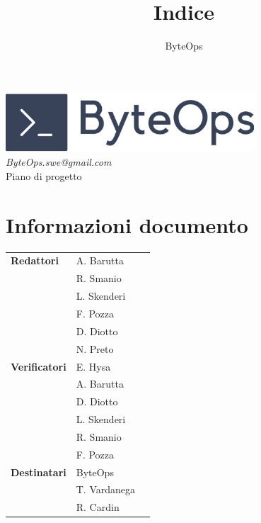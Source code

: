 \documentclass{article}
\title{\textbf{\fontsize{30}{6}\selectfont Indice}}
\author{\fontsize{14}{6}\selectfont ByteOps}
\date{}
\begin{document}
\pagestyle{fancy}
\begin{center}
    \includegraphics[width = 0.7\textwidth]{../Images/logo.png} \\
    \vspace{0.2cm}
    \textcolor[RGB]{60, 60, 60}{\textit{ByteOps.swe@gmail.com}} \\
    \vspace{1cm}
    \fontsize{16}{6}\selectfont Piano di progetto \\
    \vspace{0.5cm}
\end{center}

\section*{Informazioni documento}
\def\arraystretch{1.2}
\begin{tabular}{>{\raggedleft\arraybackslash}p{}|>{\raggedright\arraybackslash}p{}c}
    \hline
    \addlinespace
    \textbf{Redattori}    & A. Barutta\\ & R. Smanio\\ & L. Skenderi\\ & F. Pozza\\ & D. Diotto \\ & N. Preto \vspace{10pt} \\
    \textbf{Verificatori} & E. Hysa\\ & A. Barutta\\ & D. Diotto\\ & L. Skenderi\\ & R. Smanio\\ & F. Pozza \vspace{10pt} \\
    \textbf{Destinatari}  & ByteOps\\ & T. Vardanega   \\ & R. Cardin \vspace{10pt} \\
\end{tabular}
\pagebreak
\end{document}
